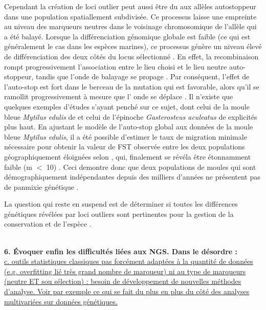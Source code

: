 \documentclass[a4paper,11pt,twoside]{report}
\begin{document}
Cependant la création de loci outlier peut aussi être du aux allèles autostoppeur dans une population spatiallement subdivisée. Ce processus laisse une empreinte au niveau des marqueurs neutres dans le voisinage chromosomique de l'allèle qui a été balayé. Lorsque la différenciation génomique globale est faible (ce qui est généralement le cas dans les espèces marines), ce processus génère un niveau élevé de différenciation des deux côtés du locus sélectionné \citep{bierne2010distinctive}. En effet, la recombinaison rompt progressivement l'association entre le lieu choisi et le lieu neutre auto-stoppeur, tandis que l'onde de balayage se propage \citep{Gagnaire:2015aa}. Par conséquent, l'effet de l'auto-stop est fort dans le berceau de la mutation qui est favorable, alors qu'il se ramollit progressivement à mesure que l' onde se déplace \citep{Gagnaire:2015aa}. Il n'existe que quelques exemples d'études s'ayant penché sur ce sujet, dont celui de la moule bleue \textit{Mytilus edulis} de \citet{bierne2010distinctive} et celui de l'épinoche \textit{Gasterosteus aculeatus} de \citet{roesti2012genome} explicités plus haut. En ajustant le modèle de l'auto-stop global aux données de la moule bleue \textit{Mytilus edulis}, il a été possible d'estimer le taux de migration minimale nécessaire pour obtenir la valeur de FST observée entre les deux populations géographiquement éloignées selon \citet{faure2008genetic}, qui, finalement se révéla être étonnamment faible (m $<$ 10) \citep{roesti2012genome}. Ceci demontre donc que deux populations de moules qui sont démographiquement indépendantes depuis des milliers d'années ne présentent pas de panmixie génétique \citep{roesti2012genome} \citep{Gagnaire:2015aa}.
	
La question qui reste en suspend est de déterminer si toutes les différences génétiques révélées par loci outliers sont pertinentes pour la gestion de la conservation et de l'espèce \citep{Gagnaire:2015aa}.

~~\\
\textbf{6. Évoquer enfin les difficultés liées aux NGS. Dans le désordre :}
~~\\

	\underline{c. outils statistiques classiques pas forcément adaptées à la quantité de données (e.g. overfitting lié très grand nombre de marqueur) ni au type de marqueurs (neutre ET sou sélection) : besoin de développement de nouvelles méthodes d'analyse. Voir par exemple ce qui se fait du plus en plus du côté des analyses multivariées sur données génétiques.}
	
\end{document}
